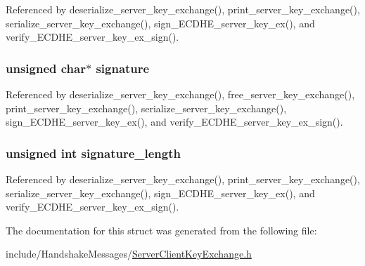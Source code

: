 Referenced by deserialize\+\_\+server\+\_\+key\+\_\+exchange(), print\+\_\+server\+\_\+key\+\_\+exchange(), serialize\+\_\+server\+\_\+key\+\_\+exchange(), sign\+\_\+\+E\+C\+D\+H\+E\+\_\+server\+\_\+key\+\_\+ex(), and verify\+\_\+\+E\+C\+D\+H\+E\+\_\+server\+\_\+key\+\_\+ex\+\_\+sign().

\subsubsection[{\texorpdfstring{signature}{signature}}]{\setlength{\rightskip}{0pt plus 5cm}unsigned char$\ast$ signature}\hypertarget{structecdhe__server__key__exchange__t_a775505f2a74638cda44fdd79c4e07993}{}\label{structecdhe__server__key__exchange__t_a775505f2a74638cda44fdd79c4e07993}


Referenced by deserialize\+\_\+server\+\_\+key\+\_\+exchange(), free\+\_\+server\+\_\+key\+\_\+exchange(), print\+\_\+server\+\_\+key\+\_\+exchange(), serialize\+\_\+server\+\_\+key\+\_\+exchange(), sign\+\_\+\+E\+C\+D\+H\+E\+\_\+server\+\_\+key\+\_\+ex(), and verify\+\_\+\+E\+C\+D\+H\+E\+\_\+server\+\_\+key\+\_\+ex\+\_\+sign().

\subsubsection[{\texorpdfstring{signature\+\_\+length}{signature_length}}]{\setlength{\rightskip}{0pt plus 5cm}unsigned int signature\+\_\+length}\hypertarget{structecdhe__server__key__exchange__t_a23a683d5129246d9adbd0029612d06a8}{}\label{structecdhe__server__key__exchange__t_a23a683d5129246d9adbd0029612d06a8}


Referenced by deserialize\+\_\+server\+\_\+key\+\_\+exchange(), print\+\_\+server\+\_\+key\+\_\+exchange(), serialize\+\_\+server\+\_\+key\+\_\+exchange(), sign\+\_\+\+E\+C\+D\+H\+E\+\_\+server\+\_\+key\+\_\+ex(), and verify\+\_\+\+E\+C\+D\+H\+E\+\_\+server\+\_\+key\+\_\+ex\+\_\+sign().



The documentation for this struct was generated from the following file\+:\begin{DoxyCompactItemize}
\item 
include/\+Handshake\+Messages/\hyperlink{_server_client_key_exchange_8h}{Server\+Client\+Key\+Exchange.\+h}\end{DoxyCompactItemize}

